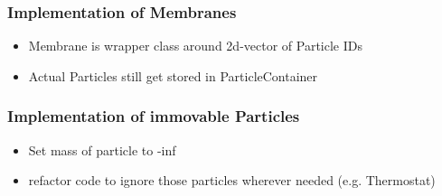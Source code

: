 
\begin{frame}
	\frametitle{Implementation of Membranes}
	\large
	\begin{itemize}
		\item Membrane is wrapper class around 2d-vector of Particle IDs
		\item Actual Particles still get stored in ParticleContainer
	\end{itemize}
\end{frame}

\begin{frame}
	\frametitle{Implementation of immovable Particles}
	\large
	\begin{itemize}
		\item Set mass of particle to -inf
		\item refactor code to ignore those particles wherever needed (e.g. Thermostat)
	\end{itemize}
\end{frame}


